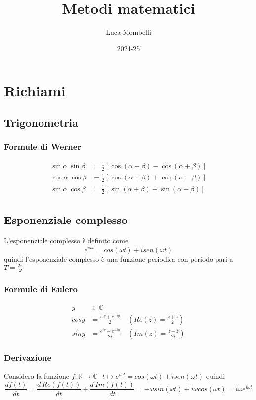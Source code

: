 \documentclass{article}
\title{Metodi matematici }
\author{Luca Mombelli}
\date{2024-25}
\theoremstyle{definition}
\newcommand{\R}{\mathbb{R}}
\begin{document}
	\maketitle
	\tableofcontents
	\newpage
	\section{Richiami}
	\subsection{Trigonometria}
	\subsubsection{Formule di Werner}
	\begin{align*}
	\sin \alpha \ \sin \beta &= \frac{1}{2}\left[ \cos (\alpha - \beta ) -\cos(\alpha +\beta)\right ]  \\
		\cos \alpha \ \cos\beta &= \frac{1}{2}\left[ \cos(\alpha +\beta)+\cos (\alpha - \beta )\right ]  \\
			\sin \alpha \ \cos \beta &= \frac{1}{2}\left[ \sin(\alpha +\beta)+\sin(\alpha - \beta )\right ]  \\
	\end{align*}
	\subsection{Esponenziale complesso}
	L'esponenziale complesso è definito come  $$e^{i\omega t}=cos(\omega t)+isen(\omega t)$$
	quindi l'esponenziale complesso è una funzione periodica con periodo pari a $T=\frac{2\pi}{\omega }$
	\subsubsection{Formule di Eulero}
	\begin{align*}
		y&\in \mathbb{C}\\
cosy&=\frac{e^{iy}+e^{-iy}}{2}      \ \ \ \ \  (Re(z)=\frac{z+\bar{z}}{2})\\
siny&=\frac{e^{iy}-e^{-iy}}{2i} \ \ \ \ \ ( Im(z)=\frac{z-\bar{z}}{2i})
	\end{align*}
\subsubsection{Derivazione}
Considero la funzione $f: \R\rightarrow \mathbb{C}\ \ \  t \mapsto e^{i\omega t}=cos(\omega t)+isen(\omega t)$ quindi 
$$\frac{df(t)}{dt}=\frac{d \ Re(f(t))}{dt}+\frac{d \ Im( f(t))}{dt}=-\omega sin(\omega t)+i\omega cos(\omega t)=i\omega e^{i\omega t}$$
\end{document}
